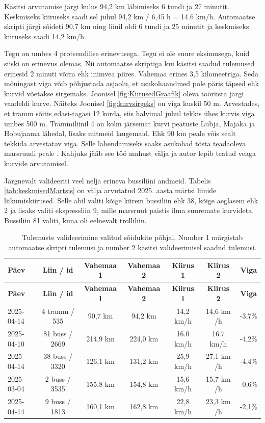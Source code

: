 Käsitsi arvutamise järgi kulus 94,2 km läbimiseks 6 tundi ja 27 minutit. Keskmiseks kiiruseks saadi sel juhul 94,2 km / 6,45 h = 14.6 km/h. Automaatse skripti järgi sõideti 90,7 km ning liinil oldi 6 tundi ja 25 minutit ja keskmiseks kiiruseks saadi 14,2 km/h. 

Tegu on umbes 4 protsendilise erinevusega. Tegu ei ole suure eksimusega, kuid siiski on erinevus olemas. Nii automaatse skriptiga kui käsitsi saadud tulemused erinesid 2 minuti võrra ehk inimvea piires. 
Vahemaa erines 3,5 kilomeetriga. Seda mõningast viga võib põhjustada asjaolu, et asukohaandmed pole päris täpsed ehk kurvid võetakse sirgemaks. Joonisel \ref{fig:KiirusedGraafik} oleva tööriista järgi vaadeldi kurve. Näiteks Joonisel \ref{fig:kurvsirgeks} on viga kuskil 50 m. Arvestades, et tramm sõitis edasi-tagasi 12 korda, siis halvimal juhul tekkis ühes kurvis viga umbes 500 m. Trammiliinil 4 on kolm järsemat kurvi peatuste Lubja, Majaka ja Hobujaama lähedal, lisaks mitmeid laugemaid. Ehk 90 km peale võis sealt tekkida arvestatav viga. Selle lahendamiseks saaks asukohad tõsta teadaoleva marsruudi peale \cite{buenosAires}. Kahjuks jääb see töö mahust välja ja autor lepib teatud veaga kurvide arvutamisel.  

Järgnevalt valideeriti veel nelja erineva bussiliini andmeid. Tabelis \ref{tab:keskmisedMartsis} on välja arvutatud 2025. aasta märtsi liinide liikumiskiirused. Selle abil valiti kõige kiirem bussiliin ehk 38, kõige aeglasem ehk 2 ja lisaks valiti ekspressliin 9, mille marsruut paistis ilma suuremate kurvideta. Bussiliin 81 valiti, kuna oli eelnevalt trolliliin.

\begin{longtable}{|l|c|c|c|c|c|c|}
\caption{Tulemuste valideerimine valitud sõidukite põhjal. Number 1 märgistab automaatse skripti tulemusi ja number 2 käsitsi valideerimisel saadud tulemusi. }
\label{tab:valideerimine}\\ \hline %
\textbf{Päev} & \textbf{Liin / id} & \textbf{Vahemaa 1} & \textbf{Vahemaa 2} & \textbf{Kiirus 1} & \textbf{Kiirus 2 } & \textbf{Viga} \\ \hline
\endfirsthead
\hline
\textbf{Päev} & \textbf{Liin / id} & \textbf{Vahemaa 1} & \textbf{Vahemaa 2} & \textbf{Kiirus 1} & \textbf{Kiirus 2 } & \textbf{Viga} \\ \hline
\endhead
2025-04-14 & 4 tramm / 535  & 90,7 km & 94,2 km & 14,2 km/h & 14,6 km /h & -3,7\% \\ \hline
2025-04-10 & 81 buss / 2669  & 214,9 km & 224,0 km & 16.0 km/h & 16.7 km/h & -4,2\% \\ \hline

2025-04-14 & 38 buss / 3320  & 126,1 km & 131,2 km & 25,9 km/h & 27.1 km /h & -4,4\% \\ \hline
2025-03-04 & 2 buss / 3535  & 155,8 km & 154,8 km & 15,6 km/h & 15,7 km /h & -0,6\% \\ \hline
2025-04-14 & 9 buss / 1813  & 160,1 km & 162,8 km & 22,8 km/h & 23,3 km /h & -2,1\% \\ \hline
\end{longtable}

